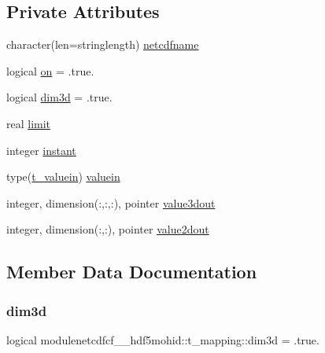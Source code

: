 \subsection*{Private Attributes}
\begin{DoxyCompactItemize}
\item 
character(len=stringlength) \mbox{\hyperlink{structmodulenetcdfcf__2__hdf5mohid_1_1t__mapping_a751689cd9d603b6680dc7789bd7d18e6}{netcdfname}}
\item 
logical \mbox{\hyperlink{structmodulenetcdfcf__2__hdf5mohid_1_1t__mapping_a203d2b52fab14a3324477d951efaebd0}{on}} = .true.
\item 
logical \mbox{\hyperlink{structmodulenetcdfcf__2__hdf5mohid_1_1t__mapping_aa77dec39e5928f6d549cde34b1300248}{dim3d}} = .true.
\item 
real \mbox{\hyperlink{structmodulenetcdfcf__2__hdf5mohid_1_1t__mapping_afe5fd846069936101779251c10308804}{limit}}
\item 
integer \mbox{\hyperlink{structmodulenetcdfcf__2__hdf5mohid_1_1t__mapping_a8f21659798354072ed4bdae008e8b2ec}{instant}}
\item 
type(\mbox{\hyperlink{structmodulenetcdfcf__2__hdf5mohid_1_1t__valuein}{t\+\_\+valuein}}) \mbox{\hyperlink{structmodulenetcdfcf__2__hdf5mohid_1_1t__mapping_ad10f2fa0bb53efa8ec4fbdc961d0631e}{valuein}}
\item 
integer, dimension(\+:,\+:,\+:), pointer \mbox{\hyperlink{structmodulenetcdfcf__2__hdf5mohid_1_1t__mapping_a499628e20b76df02eefdf7f00a3a050a}{value3dout}}
\item 
integer, dimension(\+:,\+:), pointer \mbox{\hyperlink{structmodulenetcdfcf__2__hdf5mohid_1_1t__mapping_a640eedeae2a4888fb7ff433f101219c9}{value2dout}}
\end{DoxyCompactItemize}


\subsection{Member Data Documentation}
\mbox{\label{structmodulenetcdfcf__2__hdf5mohid_1_1t__mapping_aa77dec39e5928f6d549cde34b1300248}} 
\subsubsection{\texorpdfstring{dim3d}{dim3d}}
{\footnotesize\ttfamily logical modulenetcdfcf\+\_\+\_\+hdf5mohid\+::t\+\_\+mapping\+::dim3d = .true.\hspace{0.3cm}{\ttfamily [private]}}

